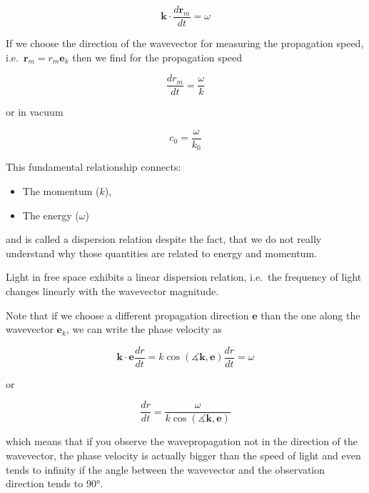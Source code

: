 \documentclass[
  a4paper,
]{book}
\providecommand{\tightlist}{%
  \setlength{\itemsep}{0pt}\setlength{\parskip}{0pt}}
\begin{document}
\[
\mathbf{k}\cdot \frac{d\mathbf{r}_{m}}{dt}=\omega
\]

If we choose the direction of the wavevector for measuring the
propagation speed, i.e.~\(\mathbf{r}_{m}=r_{m}\mathbf{e}_k\) then we
find for the propagation speed

\[
\frac{dr_{m}}{dt}=\frac{\omega}{k}
\]

or in vacuum

\begin{equation}
c_0=\frac{\omega}{k_0}
\end{equation}

This fundamental relationship connects:

\begin{itemize}
\tightlist
\item
  The momentum (\(k\)),
\item
  The energy (\(\omega\))
\end{itemize}

and is called a dispersion relation despite the fact, that we do not
really understand why those quantities are related to energy and
momentum.

\begin{tcolorbox}[enhanced jigsaw, breakable, toptitle=1mm, bottomrule=.15mm, colbacktitle=quarto-callout-note-color!10!white, title=\textcolor{quarto-callout-note-color}{\faInfo}\hspace{0.5em}{Note}, arc=.35mm, rightrule=.15mm, bottomtitle=1mm, opacityback=0, toprule=.15mm, coltitle=black, leftrule=.75mm, opacitybacktitle=0.6, colback=white, left=2mm, titlerule=0mm, colframe=quarto-callout-note-color-frame]

Light in free space exhibits a linear dispersion relation, i.e.~the
frequency of light changes linearly with the wavevector magnitude.

\end{tcolorbox}

Note that if we choose a different propagation direction \(\mathbf{e}\)
than the one along the wavevector \(\mathbf{e}_k\), we can write the
phase velocity as

\[
\mathbf{k}\cdot\mathbf{e} \frac{dr}{dt}=k\cos(\measuredangle\mathbf{k},\mathbf{e}) \frac{dr}{dt}=\omega
\]

or

\[
\frac{dr}{dt}=\frac{\omega}{k\cos(\measuredangle\mathbf{k},\mathbf{e})}
\]

which means that if you observe the wavepropagation not in the direction
of the wavevector, the phase velocity is actually bigger than the speed
of light and even tends to infinity if the angle between the wavevector
and the observation direction tends to 90°.
\end{document}
